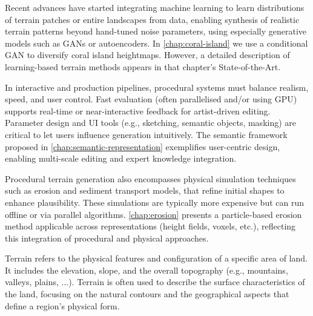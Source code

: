 Recent advances have started integrating machine learning to learn distributions of terrain patches or entire landscapes from data, enabling synthesis of realistic terrain patterns beyond hand-tuned noise parameters, using especially generative models such as GANs or autoencoders. In \cref{chap:coral-island} we use a conditional GAN to diversify coral island heightmaps. However, a detailed description of learning-based terrain methods appears in that chapter's State-of-the-Art.

In interactive and production pipelines, procedural systems must balance realism, speed, and user control. Fast evaluation (often parallelised and/or using GPU) supports real-time or near-interactive feedback for artist-driven editing. Parameter design and UI tools (e.g., sketching, semantic objects, masking) are critical to let users influence generation intuitively. The semantic  framework proposed in \cref{chap:semantic-representation} exemplifies user-centric design, enabling multi-scale editing and expert knowledge integration.

Procedural terrain generation also encompasses physical simulation techniques such as erosion and sediment transport models, that refine initial shapes to enhance plausibility. These simulations are typically more expensive but can run offline or via parallel algorithms. \cref{chap:erosion} presents a particle-based erosion method applicable across representations (height fields, voxels, etc.), reflecting this integration of procedural and physical approaches.




Terrain refers to the physical features and configuration of a specific area of land. It includes the elevation, slope, and the overall topography (e.g., mountains, valleys, plains, ...). Terrain is often used to describe the surface characteristics of the land, focusing on the natural contours and the geographical aspects that define a region's physical form.

